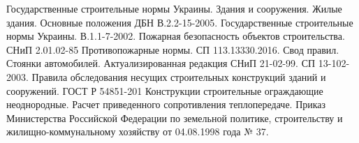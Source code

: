 \begin{thebibliography}{99}
\bibitem{}	Государственные строительные нормы Украины. Здания и сооружения. Жилые здания. Основные положения ДБН В.2.2-15-2005.
\bibitem{}	Государственные строительные нормы Украины. В.1.1-7-2002. Пожарная безопасность объектов строительства.
\bibitem{}	СНиП 2.01.02-85 Противопожарные нормы.
\bibitem{}	СП 113.13330.2016. Свод правил. Стоянки автомобилей. Актуализированная редакция СНиП 21-02-99.
\bibitem{}	СП 13-102-2003. Правила обследования несущих строительных конструкций зданий и сооружений.
\bibitem{}	ГОСТ Р 54851-201 Конструкции строительные ограждающие неоднородные. Расчет приведенного сопротивления теплопередаче.
\bibitem{}	Приказ Министерства Российской Федерации по земельной политике, строительству и жилищно-коммунальному хозяйству от 04.08.1998 года № 37.
\end{thebibliography}